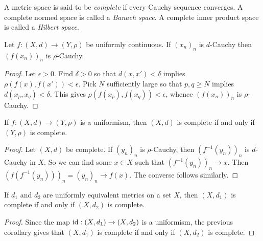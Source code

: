     \begin{definition}
        A metric space is said to be \textit{complete} if every Cauchy sequence converges. A complete normed space is called a \textit{Banach space}. A complete inner product space is called a \textit{Hilbert space}.
    \end{definition}

    \begin{lemma}
        Let $f:(X,d) \rightarrow (Y,\rho)$ be uniformly continuous. If $(x_n)_n$ is $d$-Cauchy then $(f(x_n))_n$ is $\rho$-Cauchy.
    \end{lemma}
        \begin{proof}
            Let $\epsilon > 0$. Find $\delta > 0$ so that $d(x,x') < \delta$ implies $\rho(f(x),f(x')) < \epsilon$. Pick $N$ sufficiently large so that $p,q \geq N$ implies $d(x_p,x_q) < \delta$. This gives $\rho(f(x_p),f(x_q)) < \epsilon$, whence $(f(x_n))_n$ is $\rho$-Cauchy.
        \end{proof}

    \begin{corollary}
        If $f:(X,d) \rightarrow (Y,\rho)$ is a uniformism, then $(X,d)$ is complete if and only if $(Y,\rho)$ is complete.
    \end{corollary}
        \begin{proof}
            Let $(X,d)$ be complete. If $(y_n)_n$ is $\rho$-Cauchy, then $(f^{-1}(y_n))_n$ is $d$-Cauchy in $X$. So we can find some $x \in X$ such that $(f^{-1}(y_n))_n \rightarrow x$. Then $(f(f^{-1}(y_n)))_n = (y_n)_n \rightarrow f(x)$. The converse follows similarly.
        \end{proof}

    \begin{corollary}
        If $d_1$ and $d_2$ are uniformly equivalent metrics on a set $X$, then $(X,d_1)$ is complete if and only if $(X,d_2)$ is complete.
    \end{corollary}
        \begin{proof}
            Since the map $\operatorname{id}:(X,d_1) \rightarrow (X,d_2)$ is a uniformism, the previous corollary gives that $(X,d_1)$ is complete if and only if $(X,d_2)$ is complete.
        \end{proof}
    

